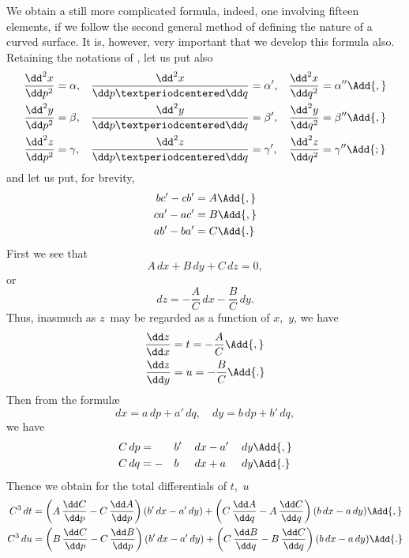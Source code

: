 
We obtain a still more complicated formula, indeed, one involving fifteen elements,
if we follow the second general method of defining the nature of a curved surface. It
is, however, very important that we develop this formula also. Retaining the notations
of , let us put also
\begin{align*}
\frac{\dd^{2}x}{\dd p^{2}} &= \alpha, &
\frac{\dd^{2}x}{\dd p·\dd q} &= \alpha', &
\frac{\dd^{2}x}{\dd q^{2}} &= \alpha''\Add{,} \\
%
\frac{\dd^{2}y}{\dd p^{2}} &= \beta, &
\frac{\dd^{2}y}{\dd p·\dd q} &= \beta', &
\frac{\dd^{2}y}{\dd q^{2}} &= \beta''\Add{,} \\
%
\frac{\dd^{2}z}{\dd p^{2}} &= \gamma, &
\frac{\dd^{2}z}{\dd p·\dd q} &= \gamma', &
\frac{\dd^{2}z}{\dd q^{2}} &= \gamma''\Add{;} \\
\end{align*}
and let us put, for brevity,
\begin{align*}
bc' - cb' &= A\Add{,} \\
ca' - ac' &= B\Add{,} \\
ab' - ba' &= C\Add{.}
\end{align*}
First we see that
\[
A\, dx + B\, dy + C\, dz = 0,
\]
or
\[
dz = -\frac{A}{C}\, dx - \frac{B}{C}\, dy.
\]
Thus, inasmuch as $z$~may be regarded as a function of $x$,~$y$, we have
\begin{align*}
\frac{\dd z}{\dd x} &= t = -\frac{A}{C}\Add{,} \\
\frac{\dd z}{\dd y} &= u = -\frac{B}{C}\Add{.}
\end{align*}
Then from the formulæ
\[
dx = a\, dp + a'\, dq,\quad
dy = b\, dp + b'\, dq,
\]
we have
\begin{alignat*}{4}
&C\, dp = &&b'\, &&dx - a'\, &&dy\Add{,} \\
&C\, dq =-&&b\,  &&dx + a\,  &&dy\Add{.}
\end{alignat*}
Thence we obtain for the total differentials of $t$,~$u$
\begin{alignat*}{2}
C^{3}\, dt
  &= \left(A\, \frac{\dd C}{\dd p} - C\, \frac{\dd A}{\dd p}\right)(b'\, dx - a'\, dy)
   + \left(C\, \frac{\dd A}{\dd q} - A\, \frac{\dd C}{\dd q}\right)(b \, dx - a \, dy)\Add{,} \\
%
C^{3}\, du
  &= \left(B\, \frac{\dd C}{\dd p} - C\, \frac{\dd B}{\dd p}\right)(b'\, dx - a'\, dy)
   + \left(C\, \frac{\dd B}{\dd q} - B\, \frac{\dd C}{\dd q}\right)(b \, dx - a \, dy)\Add{.}
\end{alignat*}
